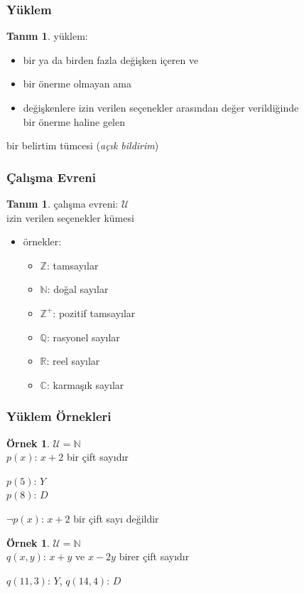 \documentclass[dvipsnames]{beamer}
\theoremstyle{definition}
\newtheorem{tanim}[theorem]{Tanım}
\theoremstyle{example}
\newtheorem{ornek}[theorem]{Örnek}
\theoremstyle{plain}
\begin{document}
\begin{frame}
  \frametitle{Yüklem}

  \begin{tanim}
    \alert{yüklem}:

    \begin{itemize}
      \item bir ya da birden fazla değişken içeren ve
      \item bir önerme olmayan ama
      \item değişkenlere izin verilen seçenekler arasından değer verildiğinde\\
        bir önerme haline gelen
    \end{itemize}

    bir belirtim tümcesi (\emph{açık bildirim})
  \end{tanim}
\end{frame}

\begin{frame}
  \frametitle{Çalışma Evreni}

  \begin{tanim}
    \alert{çalışma evreni}: $\mathcal{U}$\\
    izin verilen seçenekler kümesi
  \end{tanim}

  \pause
  \begin{itemize}
    \item örnekler:
    \begin{itemize}
      \item $\mathbb{Z}$: tamsayılar
      \item $\mathbb{N}$: doğal sayılar
      \item $\mathbb{Z}^+$: pozitif tamsayılar
      \item $\mathbb{Q}$: rasyonel sayılar
      \item $\mathbb{R}$: reel sayılar
      \item $\mathbb{C}$: karmaşık sayılar
    \end{itemize}
  \end{itemize}
\end{frame}

\begin{frame}
  \frametitle{Yüklem Örnekleri}

  \begin{ornek}
    $\mathcal{U} = \mathbb{N}$\\
    $p(x)$: $x+2$ bir çift sayıdır

    \bigskip
    $p(5)$: $Y$\\
    $p(8)$: $D$

    \pause
    \bigskip
    $\neg p(x)$: $x+2$ bir çift sayı değildir
  \end{ornek}

  \pause
  \begin{ornek}
    $\mathcal{U} = \mathbb{N}$\\
    $q(x,y)$: $x+y$ ve $x-2y$ birer çift sayıdır

    \bigskip
    $q(11,3)$: $Y$, $q(14,4)$: $D$
  \end{ornek}
\end{frame}
\end{document}
